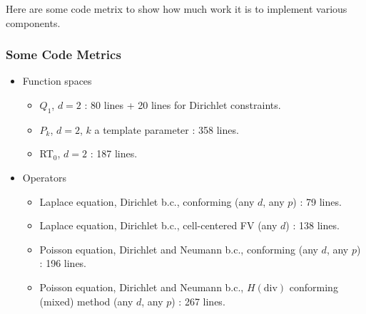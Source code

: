 
Here are some code metrix to show how much work it is to implement
various components.

\begin{frame}
\frametitle<presentation>{Some Code Metrics}
\begin{itemize}
\item Function spaces
\begin{itemize}
\item $Q_1$, $d=2$ : 80 lines + 20 lines for Dirichlet constraints.
\item $P_k$, $d=2$, $k$ a template parameter : 358 lines.
\item RT$_0$, $d=2$ : 187 lines.
\end{itemize}
\item Operators
\begin{itemize}
\item Laplace equation, Dirichlet b.c., conforming (any $d$, any $p$) : 79 lines.
\item Laplace equation, Dirichlet b.c., cell-centered FV (any $d$) : 138 lines.
\item Poisson equation, Dirichlet and Neumann b.c., conforming (any $d$, any $p$) : 196 lines.
\item Poisson equation, Dirichlet and Neumann b.c., $H(\text{div})$
conforming (mixed) method (any $d$, any $p$) : 267 lines. 
\end{itemize}
\end{itemize}
\end{frame}

